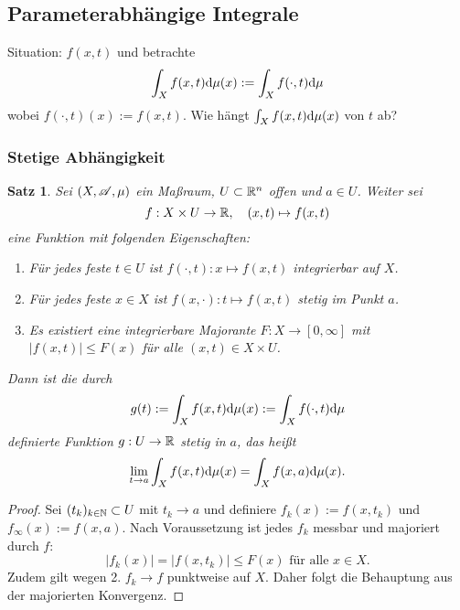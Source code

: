 \documentclass[
 a4paper,
 12pt,
 parskip=half
 ]{scrartcl}
\theoremstyle{plain}
\newtheorem*{thm*}{Satz}
\theoremstyle{definition}
\numberwithin{equation}{section}
\begin{document}
\subsection{Parameterabhängige Integrale}
Situation: $f(x,t)$ und betrachte
\[ \int_X f(x,t) \mathrm{d} \mu(x) := \int_X f( \cdot, t ) \mathrm{d} \mu \]
wobei $f( \cdot, t)(x) := f(x,t)$. Wie hängt $\int_X f(x,t) \mathrm{d} \mu(x)$ von $t$ ab?

\subsubsection{Stetige Abhängigkeit}
\begin{thm*}
 Sei $(X, \mathscr{A}, \mu)$ ein Maßraum, $U \subset \mathbb{R}^n$ offen und $a \in U$. Weiter sei
 \[ f: X \times U \to \mathbb{R}, \quad (x,t) \mapsto f(x,t) \]
 eine Funktion mit folgenden Eigenschaften:
 \begin{enumerate}
  \item Für jedes feste $t \in U$ ist $f( \cdot, t ): x \mapsto f(x,t)$ integrierbar auf $X$.
  \item Für jedes feste $x \in X$ ist $f( x, \cdot ): t \mapsto f(x,t)$ stetig im Punkt $a$.
  \item Es existiert eine integrierbare Majorante $F: X \to [0,\infty]$ mit $|f(x,t)| \le F(x)$ für alle $(x,t) \in X \times U$.
 \end{enumerate}
 Dann ist die durch
 \[ g(t) := \int_X f(x,t) \mathrm{d} \mu(x) := \int_X f( \cdot, t ) \mathrm{d} \mu \]
 definierte Funktion $g: U \to \mathbb{R}$ stetig in $a$, das heißt
 \[ \lim_{t \to a} \int_X f(x,t) \mathrm{d} \mu(x) = \int_X f(x,a) \mathrm{d} \mu(x). \]
\end{thm*}

\begin{proof}
 Sei $(t_k)_{k \in \mathbb{N}} \subset U$ mit $t_k \to a$ und definiere $f_k(x) := f(x, t_k)$ und $f_\infty(x) := f(x, a)$. Nach Voraussetzung ist jedes $f_k$ messbar und majoriert durch $f$:
 \[ |f_k(x)| = |f(x,t_k)| \le F(x) \text{ für alle } x \in X. \]
 Zudem gilt wegen 2. $f_k \to f$ punktweise auf $X$. Daher folgt die Behauptung aus der majorierten Konvergenz.
\end{proof}
\end{document}
